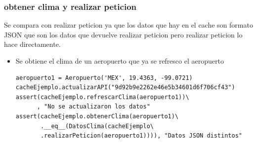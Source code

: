 \documentclass[12pt]{article}
\begin{document}
\subsubsection{obtener clima y realizar peticion}
Se compara con realizar peticion ya que los datos que hay en el cache son formato JSON que son los datos que devuelve realizar peticion pero realizar peticion lo hace directamente.
\begin{itemize}
\item Se obtiene el clima de un aeropuerto que ya se refresco el aeropuerto
\begin{verbatim}
aeropuerto1 = Aeropuerto('MEX', 19.4363, -99.0721)
cacheEjemplo.actualizarAPI("9d92b9e2262e46e5b34601d6f706cf43")
assert(cacheEjemplo.refrescarClima(aeropuerto1))\
      , "No se actualizaron los datos"
assert(cacheEjemplo.obtenerClima(aeropuerto1)\
       .__eq__(DatosClima(cacheEjemplo\
       .realizarPeticion(aeropuerto1)))), "Datos JSON distintos"
\end{verbatim}
    \newpage


\end{itemize}
\end{document}
